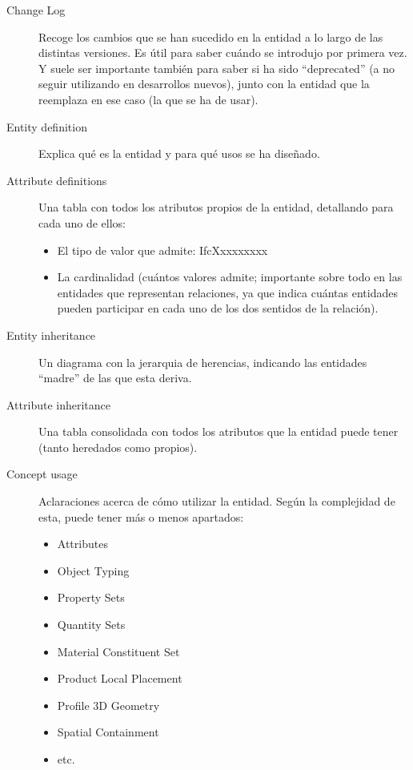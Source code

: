 \documentclass[spanish,10pt,a4paper,final,oneside]{article}
\begin{document}
\begin{description}

\item[Change Log] Recoge los cambios que se han sucedido en la entidad a lo largo de las distintas versiones. Es útil para saber cuándo se introdujo por primera vez. Y suele ser importante también para saber si ha sido ``deprecated'' (a no seguir utilizando en desarrollos nuevos), junto con la entidad que la reemplaza en ese caso (la que se ha de usar).

\item[Entity definition] Explica qué es la entidad y para qué usos se ha diseñado.

\item[Attribute definitions] Una tabla con todos los atributos propios de la entidad, detallando para cada uno de ellos:
\begin{itemize}
\item El tipo de valor que admite:  IfcXxxxxxxxx
\item La cardinalidad (cuántos valores admite; importante sobre todo en las entidades que representan relaciones, ya que indica cuántas entidades pueden participar en cada uno de los dos sentidos de la relación). 
\end{itemize}

\item[Entity inheritance] Un diagrama con la jerarquia de herencias, indicando las entidades ``madre'' de las que esta deriva.

\item[Attribute inheritance] Una tabla consolidada con todos los atributos que la entidad puede tener (tanto heredados como propios).

\item[Concept usage] Aclaraciones acerca de cómo utilizar la entidad. Según la complejidad de esta, puede tener más o menos apartados:
\begin{itemize}
\item Attributes
\item Object Typing
\item Property Sets
\item Quantity Sets
\item Material Constituent Set
\item Product Local Placement
\item Profile 3D Geometry
\item Spatial Containment
\item etc.
\end{itemize}


\end{description}
\end{document}
